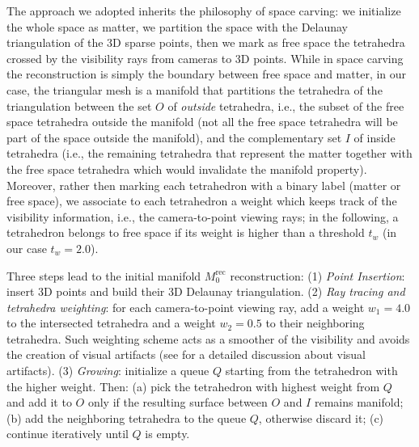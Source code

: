 The approach we adopted inherits the philosophy of space carving: we initialize the whole space as matter, we partition the space with the Delaunay triangulation of the 3D sparse points, then we mark as free space the tetrahedra crossed by the visibility rays from cameras to 3D points. 
While in space carving the reconstruction is simply the boundary between free space and matter, in our case, the triangular mesh is a manifold  that partitions the tetrahedra of the triangulation between the set $O$ of \emph{outside} tetrahedra, i.e., the subset of the free space tetrahedra outside the manifold (not all the free space tetrahedra will be part of the space outside the manifold), and the complementary set $I$ of inside tetrahedra (i.e., the remaining tetrahedra that represent the matter together with the free space tetrahedra which would invalidate the manifold property). Moreover, rather then marking each tetrahedron with a binary label (matter or free space), we associate  to each tetrahedron a weight which keeps track of the visibility information, i.e., the camera-to-point viewing rays; in the following, a tetrahedron belongs to free space if its weight is higher than a threshold $t_w$ (in our case $t_w = 2.0$).



Three steps lead to the initial manifold $\mathit{M}_{0}^{\text{rec}}$ reconstruction: (1)  \emph{Point Insertion}: insert 3D points and build their 3D Delaunay triangulation. (2) \emph{Ray tracing and tetrahedra weighting}: for each camera-to-point viewing ray, add a weight $w_1 = 4.0$ to the intersected tetrahedra and a weight $w_2=0.5$ to their neighboring tetrahedra.
Such weighting scheme acts as a smoother of the visibility and avoids the creation of visual artifacts (see \cite{litvinov_Lhiuller14} for a detailed discussion about visual artifacts). (3) \emph{Growing}: initialize a queue $Q$ starting from the tetrahedron with the higher weight. 
Then: (a) pick  the tetrahedron with highest weight from $Q$ and add it to $O$ only if the resulting surface between $O$ and $I$ remains manifold; (b) add the neighboring tetrahedra to the queue $Q$, otherwise discard it; (c) continue iteratively until $Q$ is empty.
  


